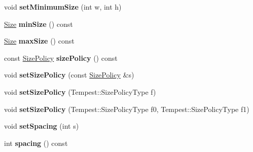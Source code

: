 \begin{DoxyCompactItemize}
\item 
\hypertarget{class_tempest_1_1_widget_a99b7bb76bc0a0ba5584fb800d6dfb79f}{void {\bfseries set\+Minimum\+Size} (int w, int h)}\label{class_tempest_1_1_widget_a99b7bb76bc0a0ba5584fb800d6dfb79f}

\item 
\hypertarget{class_tempest_1_1_widget_a97a388d5e26185f40419f3af4fb2f7e1}{\hyperlink{struct_tempest_1_1_size}{Size} {\bfseries min\+Size} () const }\label{class_tempest_1_1_widget_a97a388d5e26185f40419f3af4fb2f7e1}

\item 
\hypertarget{class_tempest_1_1_widget_aea4c2e65ddb12cd1b626966d55bb4e99}{\hyperlink{struct_tempest_1_1_size}{Size} {\bfseries max\+Size} () const }\label{class_tempest_1_1_widget_aea4c2e65ddb12cd1b626966d55bb4e99}

\item 
\hypertarget{class_tempest_1_1_widget_ac7e1bb5e281f1ffb9d17bc787eab35a3}{const \hyperlink{struct_tempest_1_1_size_policy}{Size\+Policy} {\bfseries size\+Policy} () const }\label{class_tempest_1_1_widget_ac7e1bb5e281f1ffb9d17bc787eab35a3}

\item 
\hypertarget{class_tempest_1_1_widget_a1423fb19112428c8e983e2f9118e336b}{void {\bfseries set\+Size\+Policy} (const \hyperlink{struct_tempest_1_1_size_policy}{Size\+Policy} \&s)}\label{class_tempest_1_1_widget_a1423fb19112428c8e983e2f9118e336b}

\item 
\hypertarget{class_tempest_1_1_widget_a8f93a50c1c55dadf153b698f01656a65}{void {\bfseries set\+Size\+Policy} (Tempest\+::\+Size\+Policy\+Type f)}\label{class_tempest_1_1_widget_a8f93a50c1c55dadf153b698f01656a65}

\item 
\hypertarget{class_tempest_1_1_widget_ac4fbe7a9b6fa7ede26f130f55f21bea8}{void {\bfseries set\+Size\+Policy} (Tempest\+::\+Size\+Policy\+Type f0, Tempest\+::\+Size\+Policy\+Type f1)}\label{class_tempest_1_1_widget_ac4fbe7a9b6fa7ede26f130f55f21bea8}

\item 
\hypertarget{class_tempest_1_1_widget_aee7dec5a799947f70ab5b53eb94e64ea}{void {\bfseries set\+Spacing} (int s)}\label{class_tempest_1_1_widget_aee7dec5a799947f70ab5b53eb94e64ea}

\item 
\hypertarget{class_tempest_1_1_widget_a6fc7815cca483def71d48307a005c7e9}{int {\bfseries spacing} () const }\label{class_tempest_1_1_widget_a6fc7815cca483def71d48307a005c7e9}


\end{DoxyCompactItemize}
